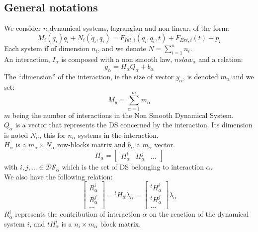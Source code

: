 \documentclass[10pt]{report}
\begin{document}
\subsection{General notations}
We consider $n$ dynamical systems, lagrangian and non linear, of the form:
\begin{equation}
M_i(q_i) \ddot q_i + N_i(\dot q_i, q_i) = F_{Int,i}(\dot q_i , q_i , t)+F_{Ext,i}(t) + p_i
\end{equation}
Each system if of dimension $n_i$, and we denote $N = \displaystyle{\sum_{i=1}^{n} n_i}$. \\
An interaction, $I_{\alpha}$ is composed with a non smooth law, $nslaw_{\alpha}$ and a relation:
\begin{equation}
y_{\alpha} = H_{\alpha}Q_{\alpha} + b_{\alpha}
\end{equation}
The ``dimension'' of the interaction, ie the size of vector $y_{\alpha}$, is denoted $m_{\alpha}$ and we set:
$$ M_y = \sum_{\alpha=1}^{m} m_{\alpha}$$
$m$ being the number of interactions in the Non Smooth Dynamical System.  \\
$Q_{\alpha}$ is a vector that represents the DS concerned by the interaction. Its dimension is noted $N_{\alpha}$, this for $n_{\alpha}$ systems in the interaction. \\
$H_{\alpha}$ is a $m_{\alpha} \times N_{\alpha}$ row-blocks matrix and $b_{\alpha}$ a $m_{\alpha}$ vector. \\
\begin{equation}
H_{\alpha}=\left[\begin{array}{ccc}
H_{\alpha}^i & H_{\alpha}^j & ...\end{array}\right]
\end{equation}
with $i,j,...\in \mathcal{DS}_{\alpha}$ which is the set of DS belonging to interaction $\alpha$.\\
We also have the following relation:
\begin{equation}
\left[\begin{array}{c}
R_{\alpha}^i \\
R_{\alpha}^j \\
...
\end{array}\right] = {}^tH_{\alpha}\lambda_{\alpha}
=\left[\begin{array}{c}
{}^tH_{\alpha}^i \\
{}^tH_{\alpha}^j \\
...
\end{array}\right]\lambda_{\alpha}
\end{equation}
$R_{\alpha}^i$ represents the contribution of interaction $\alpha$ on the reaction of the dynamical system $i$, and ${}tH_{\alpha}^i$ is a $n_i \times m_{\alpha}$ block matrix. \\
\end{document}
